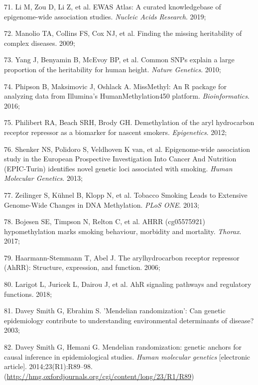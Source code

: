 \documentclass[11pt,twoside]{bristolthesis}
\newenvironment{cslreferences}%
  {}%
  {\par}
\begin{document}
\begin{cslreferences}
\leavevmode\hypertarget{ref-Li2019}{}%
71. Li M, Zou D, Li Z, et al. EWAS Atlas: A curated knowledgebase of epigenome-wide association studies. \emph{Nucleic Acids Research}. 2019;

\leavevmode\hypertarget{ref-Manolio2009}{}%
72. Manolio TA, Collins FS, Cox NJ, et al. Finding the missing heritability of complex diseases. 2009;

\leavevmode\hypertarget{ref-Yang2010}{}%
73. Yang J, Benyamin B, McEvoy BP, et al. Common SNPs explain a large proportion of the heritability for human height. \emph{Nature Genetics}. 2010;

\leavevmode\hypertarget{ref-Phipson2016}{}%
74. Phipson B, Maksimovic J, Oshlack A. MissMethyl: An R package for analyzing data from Illumina's HumanMethylation450 platform. \emph{Bioinformatics}. 2016;

\leavevmode\hypertarget{ref-Philibert2012}{}%
75. Philibert RA, Beach SRH, Brody GH. Demethylation of the aryl hydrocarbon receptor repressor as a biomarker for nascent smokers. \emph{Epigenetics}. 2012;

\leavevmode\hypertarget{ref-Shenker2013}{}%
76. Shenker NS, Polidoro S, Veldhoven K van, et al. Epigenome-wide association study in the European Prospective Investigation Into Cancer And Nutrition (EPIC-Turin) identifies novel genetic loci associated with smoking. \emph{Human Molecular Genetics}. 2013;

\leavevmode\hypertarget{ref-Zeilinger2013}{}%
77. Zeilinger S, Kühnel B, Klopp N, et al. Tobacco Smoking Leads to Extensive Genome-Wide Changes in DNA Methylation. \emph{PLoS ONE}. 2013;

\leavevmode\hypertarget{ref-Bojesen2017}{}%
78. Bojesen SE, Timpson N, Relton C, et al. AHRR (cg05575921) hypomethylation marks smoking behaviour, morbidity and mortality. \emph{Thorax}. 2017;

\leavevmode\hypertarget{ref-Haarmann-Stemmann2006}{}%
79. Haarmann-Stemmann T, Abel J. The arylhydrocarbon receptor repressor (AhRR): Structure, expression, and function. 2006;

\leavevmode\hypertarget{ref-Larigot2018}{}%
80. Larigot L, Juricek L, Dairou J, et al. AhR signaling pathways and regulatory functions. 2018;

\leavevmode\hypertarget{ref-DaveySmith2003}{}%
81. Davey Smith G, Ebrahim S. 'Mendelian randomization': Can genetic epidemiology contribute to understanding environmental determinants of disease? 2003;

\leavevmode\hypertarget{ref-DaveySmith2014}{}%
82. Davey Smith G, Hemani G. Mendelian randomization: genetic anchors for causal inference in epidemiological studies. \emph{Human molecular genetics} {[}electronic article{]}. 2014;23(R1):R89--98. (\url{http://hmg.oxfordjournals.org/cgi/content/long/23/R1/R89})


\end{cslreferences}
\end{document}
